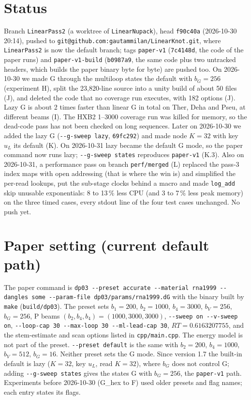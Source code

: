 \documentclass[11pt]{article}
\begin{document}
\section{Status}
Branch \texttt{LinearPass2} (a worktree of \texttt{LinearNupack}), head \texttt{f90c40a} (2026-10-30 20:14), pushed to \texttt{git@github.com:gautammilan/LinearKnot.git}, where \texttt{LinearPass2} is now the default branch; tags \texttt{paper-v1} (\texttt{7c4148d}, the code of the paper runs) and \texttt{paper-v1-build} (\texttt{b0987a9}, the same code plus two untracked headers, which builds the paper binary byte for byte) are pushed too. On 2026-10-30 we made G through the multiloop states the default with $b_G=256$ (experiment H), split the 23{,}820-line source into a unity build of about 50 files (J), and deleted the code that no coverage run executes, with 182 options (J). Lazy G is about 2 times faster than linear G in total on Ther, Deha and Pseu, at different beams (I). The HXB2 1--3000 coverage run was killed for memory, so the dead-code pass has not been checked on long sequences. Later on 2026-10-30 we added the lazy G (\texttt{-{}-g-sweep lazy}, \texttt{69fc292}) and made node $K=32$ with key $u_L$ its default (K). On 2026-10-31 lazy became the default G mode, so the paper command now runs lazy; \texttt{-{}-g-sweep states} reproduces \texttt{paper-v1} (K.3). Also on 2026-10-31, a performance pass on branch \texttt{perf/merged} (L) replaced the pass-3 index maps with open addressing (that is where the win is) and simplified the per-read lookups, put the sub-stage clocks behind a macro and made \texttt{log\_add} skip unusable exponentials: 8 to 13\,\% less CPU (and 3 to 7\,\% less peak memory) on the three timed cases, every stdout line of the four test cases unchanged. No push yet.

\section{Paper setting (current default path)}
The paper command is \texttt{dp03 -{}-preset accurate -{}-material rna1999 -{}-dangles some -{}-param-file dp03/params/rna1999.dG} with the binary built by \texttt{make} (\texttt{build/dp03}). The preset sets $b_1=200$, $b_2=1000$, $b_4=3000$, $b_V=256$, $b_G=256$, P beams $(b_2,b_4,b_4)=(1000,3000,3000)$, \texttt{-{}-sweep on -{}-v-sweep on}, \texttt{-{}-loop-cap 30 -{}-max-loop 30 -{}-ml-lead-cap 30}, $RT=0.6163207755$, and the stem-estimate and scan options listed in \texttt{cpp/main.cpp}. The energy model is not part of the preset. \texttt{-{}-preset default} is the same with $b_2=200$, $b_4=1000$, $b_V=512$, $b_G=16$. Neither preset sets the G mode. Since version 1.7 the built-in default is lazy ($K=32$, key $u_L$, read $K=32$), where $b_G$ does not control G; adding \texttt{-{}-g-sweep states} gives the states G with $b_G=256$, the \texttt{paper-v1} path. Experiments before 2026-10-30 (G\_hex to F) used older presets and flag names; each entry states its flags.
\end{document}
